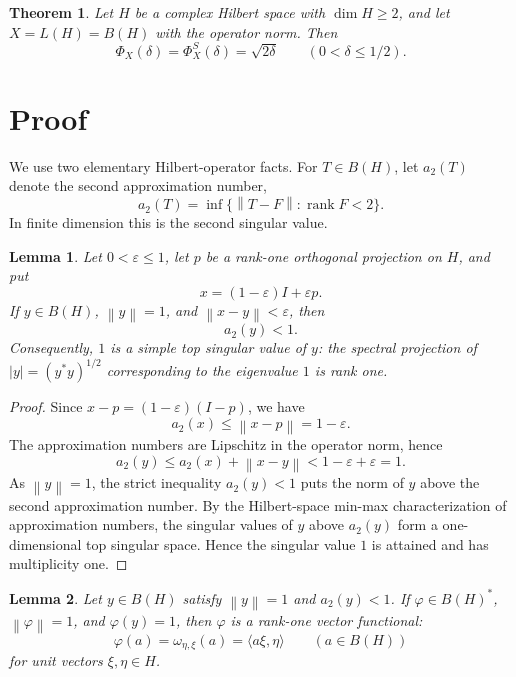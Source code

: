\documentclass[11pt]{article}
\newtheorem{theorem}{Theorem}
\newtheorem{lemma}{Lemma}
\newcommand{\rank}{\operatorname{rank}}
\newcommand{\norm}[1]{\left\lVert #1 \right\rVert}
\newcommand{\eps}{\varepsilon}
\begin{document}
\begin{theorem}
Let \(H\) be a complex Hilbert space with \(\dim H\ge2\), and let
\(X=L(H)=B(H)\) with the operator norm. Then
\[
  \Phi_X(\delta)=\Phi_X^S(\delta)=\sqrt{2\delta}
  \qquad (0<\delta\leq 1/2).
\]
\end{theorem}

\section*{Proof}

We use two elementary Hilbert-operator facts. For \(T\in B(H)\), let
\(a_2(T)\) denote the second approximation number,
\[
  a_2(T)=\inf\{\norm{T-F}: \rank F<2\}.
\]
In finite dimension this is the second singular value.

\begin{lemma}\label{lem:simple-top}
Let \(0<\eps\le1\), let \(p\) be a rank-one orthogonal projection on \(H\),
and put
\[
  x=(1-\eps)I+\eps p .
\]
If \(y\in B(H)\), \(\norm{y}=1\), and \(\norm{x-y}<\eps\), then
\[
  a_2(y)<1.
\]
Consequently, \(1\) is a simple top singular value of \(y\): the spectral
projection of \(|y|=(y^*y)^{1/2}\) corresponding to the eigenvalue \(1\) is
rank one.
\end{lemma}

\begin{proof}
Since \(x-p=(1-\eps)(I-p)\), we have
\[
  a_2(x)\leq \norm{x-p}=1-\eps .
\]
The approximation numbers are Lipschitz in the operator norm, hence
\[
  a_2(y)\leq a_2(x)+\norm{x-y}<1-\eps+\eps=1.
\]
As \(\norm{y}=1\), the strict inequality \(a_2(y)<1\) puts the norm of
\(y\) above the second approximation number. By the Hilbert-space min-max
characterization of approximation numbers, the singular values of \(y\)
above \(a_2(y)\) form a one-dimensional top singular space. Hence the
singular value \(1\) is attained and has multiplicity one.
\end{proof}

\begin{lemma}\label{lem:norming-rank-one}
Let \(y\in B(H)\) satisfy \(\norm{y}=1\) and \(a_2(y)<1\). If
\(\varphi\in B(H)^*\), \(\norm{\varphi}=1\), and \(\varphi(y)=1\), then
\(\varphi\) is a rank-one vector functional:
\[
  \varphi(a)=\omega_{\eta,\xi}(a)=\langle a\xi,\eta\rangle
  \qquad(a\in B(H))
\]
for unit vectors \(\xi,\eta\in H\).
\end{lemma}
\end{document}
